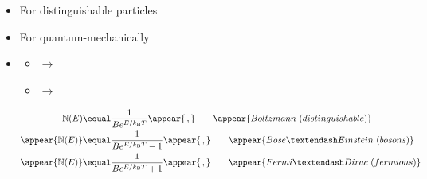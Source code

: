 \begin{frame}
\frametitle{\texorpdfstring{\culine[\sectiontitleulinecolor]{\sectiontitle}}{\sectiontitle} }

\begin{itemize}
	\item For distinguishable particles

\item For quantum-mechanically 
\item[] \begin{itemize}[itemsep=2.5mm]
	\item {} $\rightarrow$ 
	\item {} $\rightarrow$ 
\end{itemize}

\[
\begin{aligned}
\mathbb{N}(E) & \equal  \frac{1}{B e^{E / k_{\mathrm{B}} T}} \appear{\,,} \qquad \appear{Boltzmann~(distinguishable)} \\
\appear{\mathbb{N}(E)} & \equal  \frac{1}{B e^{E / k_{\mathrm{B}} T}-1} \appear{\,,} \qquad \appear{Bose–Einstein~(bosons)} \\
\appear{\mathbb{N}(E)} & \equal  \frac{1}{B e^{E / k_{\mathrm{B}} T}+1} \appear{\,,} \qquad \appear{Fermi–Dirac~(fermions)}
\end{aligned}
\]

\end{itemize}

\endofslide 
\end{frame}

